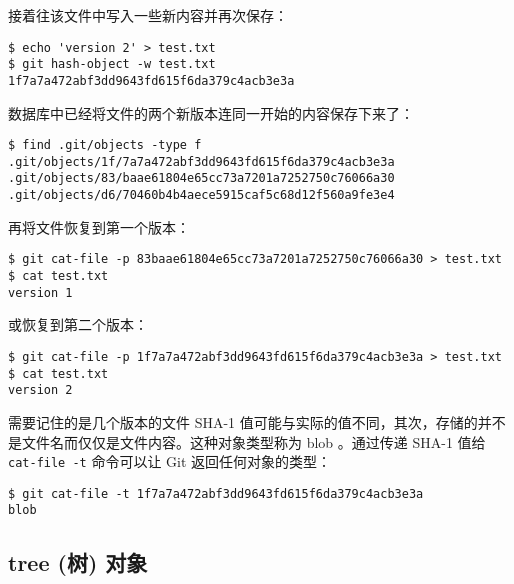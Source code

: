 \documentclass[a4paper]{book}
\begin{document}
接着往该文件中写入一些新内容并再次保存：

\begin{shaded}\begin{verbatim}
$ echo 'version 2' > test.txt
$ git hash-object -w test.txt
1f7a7a472abf3dd9643fd615f6da379c4acb3e3a
\end{verbatim}\end{shaded}

数据库中已经将文件的两个新版本连同一开始的内容保存下来了：

\begin{shaded}\begin{verbatim}
$ find .git/objects -type f
.git/objects/1f/7a7a472abf3dd9643fd615f6da379c4acb3e3a
.git/objects/83/baae61804e65cc73a7201a7252750c76066a30
.git/objects/d6/70460b4b4aece5915caf5c68d12f560a9fe3e4
\end{verbatim}\end{shaded}

再将文件恢复到第一个版本：

\begin{shaded}\begin{verbatim}
$ git cat-file -p 83baae61804e65cc73a7201a7252750c76066a30 > test.txt
$ cat test.txt
version 1
\end{verbatim}\end{shaded}

或恢复到第二个版本：

\begin{shaded}\begin{verbatim}
$ git cat-file -p 1f7a7a472abf3dd9643fd615f6da379c4acb3e3a > test.txt
$ cat test.txt
version 2
\end{verbatim}\end{shaded}

需要记住的是几个版本的文件 SHA-1 值可能与实际的值不同，其次，存储的并不是文件名而仅仅是文件内容。这种对象类型称为 blob 。通过传递 SHA-1 值给 \texttt{cat-file -t} 命令可以让 Git 返回任何对象的类型：

\begin{shaded}\begin{verbatim}
$ git cat-file -t 1f7a7a472abf3dd9643fd615f6da379c4acb3e3a
blob
\end{verbatim}\end{shaded}

\subsection{tree (树) 对象}
\end{document}
